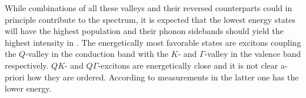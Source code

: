 While combinations of all these valleys and their reversed counterparts could in principle contribute to the \pl spectrum, it is expected that the lowest energy states will have the highest population and their phonon sidebands should yield the highest intensity in \pl\!. The energetically most favorable states are excitons coupling the $Q$-valley in the conduction band with the $K$- and $\Gamma$-valley in the valence band respectively. $QK$- and $Q\Gamma$-excitons are energetically close and it is not clear a-priori how they are ordered. According to measurements in  \cite{lindlau_role_2017} the latter one has the lower energy. 